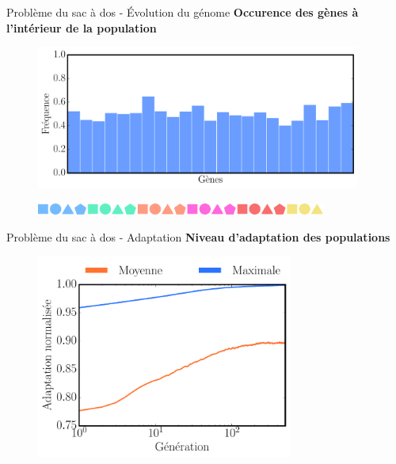 \begin{frame}{Problème du sac à dos - Évolution du génome}
\textbf{Occurence des gènes à l'intérieur de la population}
  \begin{figure}[h!]
    \centering
    \href{run:figures/genome_dist.mp4}{\includegraphics[width=0.95\textwidth]{figures/genome_dist.pdf}}
  \end{figure}
  \vspace{-30pt}
  \begin{figure}[h!]
    \centering
    \hspace{25pt}\includegraphics[width=0.85\textwidth]{figures/formes.pdf}
  \end{figure}
\end{frame}

\begin{frame}{Problème du sac à dos - Adaptation}
\vspace{-10pt}
\textbf{Niveau d'adaptation des populations}
  \begin{figure}[h!]
    \centering
    \includegraphics[width=0.75\textwidth]{figures/knapsack_adaptation.pdf}
  \end{figure}
\end{frame}